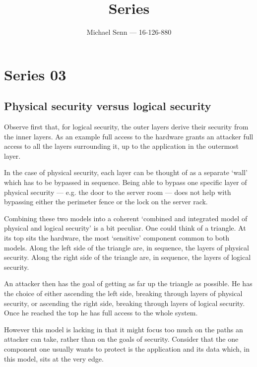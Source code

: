 \documentclass[a4paper]{scrreprt}
\title{Series \series}
\author{Michael Senn \maillink{michael.senn@students.unibe.ch} --- 16-126-880}
\date{\printdate}
\newcommand{\series}{03}
\begin{document}
\maketitle


\setcounter{chapter}{\numexpr \series - 1 \relax}

\chapter{Series \series}

\section{Physical security versus logical security}

Observe first that, for logical security, the outer layers derive their
security from the inner layers. As an example full access to the hardware
grants an attacker full access to all the layers surrounding it, up to the
application in the outermost layer.

In the case of physical security, each layer can be thought of as a separate
`wall' which has to be bypassed in sequence. Being able to bypass one specific
layer of physical security --- e.g. the door to the server room --- does not
help with bypassing either the perimeter fence or the lock on the server rack.

Combining these two models into a coherent `combined and integrated model of
physical and logical security' is a bit peculiar. One could think of a
triangle. At its top sits the hardware, the most `sensitive' component common
to both models. Along the left side of the triangle are, in sequence, the
layers of physical security. Along the right side of the triangle are, in
sequence, the layers of logical security.

An attacker then has the goal of getting as far up the triangle as possible.
He has the choice of either ascending the left side, breaking through layers of
physical security, or ascending the right side, breaking through layers of
logical security. Once he reached the top he has full access to the whole
system.

However this model is lacking in that it might focus too much on the paths an
attacker can take, rather than on the goals of security. Consider that the one
component one usually wants to protect is the application and its data which,
in this model, sits at the very edge.
\end{document}
